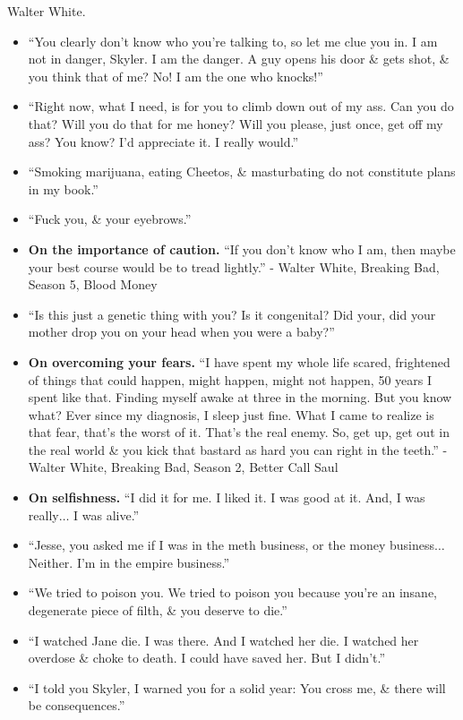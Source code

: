 \documentclass{article}
\begin{document}
\begin{enumerate}
	{\sc Walter White.}
	\begin{itemize}
		\item ``You clearly don't know who you're talking to, so let me clue you in. I am not in danger, Skyler. I am the danger. A guy opens his door \& gets shot, \& you think that of me? No! I am the one who knocks!''
		\item ``Right now, what I need, is for you to climb down out of my ass. Can you do that? Will you do that for me honey? Will you please, just once, get off my ass? You know? I'd appreciate it. I really would.''
		\item ``Smoking marijuana, eating Cheetos, \& masturbating do not constitute plans in my book.''
		\item ``Fuck you, \& your eyebrows.''
		\item {\bf On the importance of caution.} ``If you don't know who I am, then maybe your best course would be to tread lightly.'' - Walter White, Breaking Bad, Season 5, Blood Money
		\item ``Is this just a genetic thing with you? Is it congenital? Did your, did your mother drop you on your head when you were a baby?''
		\item {\bf On overcoming your fears.} ``I have spent my whole life scared, frightened of things that could happen, might happen, might not happen, 50 years I spent like that. Finding myself awake at three in the morning. But you know what? Ever since my diagnosis, I sleep just fine. What I came to realize is that fear, that's the worst of it. That's the real enemy. So, get up, get out in the real world \& you kick that bastard as hard you can right in the teeth.'' - Walter White, Breaking Bad, Season 2, Better Call Saul
		\item {\bf On selfishness.} ``I did it for me. I liked it. I was good at it. And, I was really$\ldots$ I was alive.''
		\item ``Jesse, you asked me if I was in the meth business, or the money business$\ldots$ Neither. I'm in the empire business.''
		\item ``We tried to poison you. We tried to poison you because you're an insane, degenerate piece of filth, \& you deserve to die.''
		\item ``I watched Jane die. I was there. And I watched her die. I watched her overdose \& choke to death. I could have saved her. But I didn't.''
		\item ``I told you Skyler, I warned you for a solid year: You cross me, \& there will be consequences.''

\end{itemize}
\end{enumerate}
\end{document}
